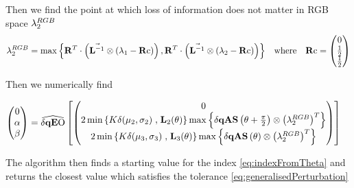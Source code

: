 Then we find the point at which loss of information does not matter in RGB space $\lambda^{RGB}_2$ 
\begin{align*}
\discard^{RGB}_2 &= \max \left\{ 
  \R^{T} \cdot \left( \nS \otimes \left( \discard_1 - \Rc \right) \right) , 
  \R^{T} \cdot \left( \nS \otimes \left( \discard_2 - \Rc \right) \right) 
\right\} &
 \text{where} \quad \Rc=
\begin{pmatrix}
                 0   \\
                 \frac{1}{2}    \\
                 \frac{1}{2}     \\
\end{pmatrix} 
\end{align*}

Then we numerically find 

\begin{align*}
 \begin{pmatrix}  0   \\   \alpha   \\  \beta   \\ \end{pmatrix}     %
        &=\dqEO\left[ \begin{pmatrix} 
         0 \\ 
         2 \min\left\{K \delta(\mu_2,\sigma_2) \right. ,  \left. \mathbf{L}_2(\theta) \right\}  \max \left\{\dqas[\theta + \frac{\pi}{2}]  \otimes \left(\discard^{RGB}_2 \right)^T \right\}  \\
         2 \min\left\{K \delta(\mu_3,\sigma_3) \right. ,  \left. \mathbf{L}_3(\theta) \right\}  \max \left\{\dqas[\theta                       ] \otimes \left(\discard^{RGB}_2 \right)^T \right\}   \\
          \end{pmatrix} \right]
\end{align*}

The algorithm then finds a starting value for the index \ref{eq:indexFromTheta} and returns the closest value which  satisfies the tolerance \ref{eq:generalisedPerturbation}


